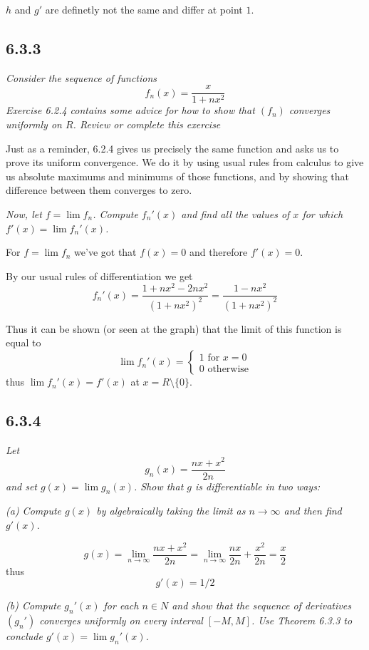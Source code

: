 \documentclass[11pt,oneside,titlepage]{book}
\begin{document}
$h$ and $g'$ are definetly not the same and differ at point $1$.

\subsection*{6.3.3}
\textit{Consider the sequence of functions}
$$f_n(x) = \frac{x}{1 + nx^2}$$
\textit{Exercise 6.2.4 contains some advice for how to show that $(f_n)$
  converges uniformly on $R$. Review or complete this exercise}

Just as a reminder, 6.2.4 gives us precisely the same function and asks us
to prove its uniform convergence. We do it by using usual rules from calculus
to give us absolute maximums and minimums of those functions, and by showing
that difference between them converges to zero.

\textit{Now, let $f = \lim{f_n}$. Compute $f_n'(x)$ and find all the values
  of $x$ for which $f'(x) = \lim{f_n'(x)}$.}

For $f = \lim f_n$ we've got that $f(x) = 0$ and therefore $f'(x) = 0$.

By our usual rules of differentiation we get 
$$f_n'(x) = \frac{1 + nx^2 - 2nx^2}{(1 + nx^2)^2} =
\frac{1 - nx^2}{(1 + nx^2)^2}$$

Thus it can be shown (or seen at the graph) that the limit of this function
is equal to
$$
\lim{f_n'(x)} =
\begin{cases}
  1 \text{ for } x = 0 \\
  0 \text{ otherwise}
\end{cases}
$$
thus $\lim{f_n'(x)} = f'(x)$ at $x = R \setminus \{0\}$.

\subsection*{6.3.4}
\textit{Let }
$$g_n(x) = \frac{nx + x^2}{2n}$$
\textit{and set $g(x) = \lim{g_n(x)}$. Show that $g$ is differentiable in two
  ways: }

\textit{(a) Compute $g(x)$ by algebraically taking the limit as $n \to \infty$
  and then find $g'(x)$.}

$$
g(x) = \lim_{n \to \infty}{\frac{nx + x^2}{2n}} =
\lim_{n \to \infty}{\frac{nx}{2n} + \frac{x^2}{2n}} = \frac{x}{2}
$$
thus
$$g'(x) = 1/2$$

\textit{(b) Compute $g_n'(x)$ for each $n \in N$ and show that the sequence
  of derivatives $(g_n')$ converges uniformly on every interval $[-M, M]$.
  Use Theorem 6.3.3 to conclude $g'(x) = \lim{g_n'(x)}$.}
\end{document}
